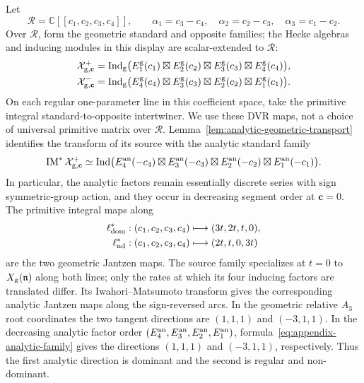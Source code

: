 \documentclass[11pt]{amsart}
\theoremstyle{definition}
\theoremstyle{remark}
\begin{document}
Let
\[
 \mathcal R=\mathbb C[[c_1,c_2,c_3,c_4]],\qquad
 \alpha_1=c_3-c_4,\quad \alpha_2=c_2-c_3,\quad
 \alpha_3=c_1-c_2.
\]
Over $\mathcal R$, form the geometric standard and opposite families; the
Hecke algebras and inducing modules in this display are scalar-extended to
$\mathcal R$:
\begin{align*}
 \mathcal X^+_{{\rm g},\mathbf c}
  &=\operatorname{Ind}_{\rm g}
    \bigl(E_1^{\rm g}(c_1)\boxtimes E_2^{\rm g}(c_2)\boxtimes
          E_3^{\rm g}(c_3)\boxtimes E_4^{\rm g}(c_4)\bigr),\\
 \mathcal X^-_{{\rm g},\mathbf c}
  &=\operatorname{Ind}_{\rm g}
    \bigl(E_4^{\rm g}(c_4)\boxtimes E_3^{\rm g}(c_3)\boxtimes
          E_2^{\rm g}(c_2)\boxtimes E_1^{\rm g}(c_1)\bigr).
\end{align*}
On each regular one-parameter line in this coefficient space, take
the primitive integral standard-to-opposite intertwiner.  We use these
DVR maps, not a choice of universal primitive matrix over $\mathcal R$.
Lemma~\ref{lem:analytic-geometric-transport} identifies the transform of
its source with the analytic standard family
\begin{equation}\label{eq:appendix-analytic-family}
 \operatorname{IM}^*\mathcal X^+_{{\rm g},\mathbf c}
 \simeq
 \operatorname{Ind}\bigl(
 E_4^{\rm an}(-c_4)\boxtimes E_3^{\rm an}(-c_3)\boxtimes
 E_2^{\rm an}(-c_2)\boxtimes E_1^{\rm an}(-c_1)\bigr).
\end{equation}
In particular, the analytic factors remain essentially discrete series with
sign symmetric-group action, and they occur in decreasing segment order at
$\mathbf c=0$.
The primitive integral maps along
\begin{align}
 \ell_{\rm dom}^*:(c_1,c_2,c_3,c_4)&\longmapsto(3t,2t,t,0),
 \label{eq:appendix-dominant-line}\\
 \ell_{\rm nd}^*:(c_1,c_2,c_3,c_4)&\longmapsto(2t,t,0,3t)
 \label{eq:appendix-nondominant-line}
\end{align}
are the two geometric Jantzen maps.  The source family specializes at
$t=0$ to $X_{\rm g}(\mathfrak n)$ along both lines; only the rates at which
its four inducing factors are translated differ.  Its Iwahori--Matsumoto
transform gives the corresponding analytic Jantzen maps along the
sign-reversed arcs.  In the geometric relative $A_3$ root coordinates the
two tangent directions are $(1,1,1)$ and $(-3,1,1)$.  In the decreasing
analytic factor order $(E_4^{\rm an},E_3^{\rm an},E_2^{\rm an},E_1^{\rm an})$,
formula~\eqref{eq:appendix-analytic-family} gives the directions
$(1,1,1)$ and $(-3,1,1)$, respectively.  Thus the first analytic direction
is dominant and the second is regular and non-dominant.
\end{document}
